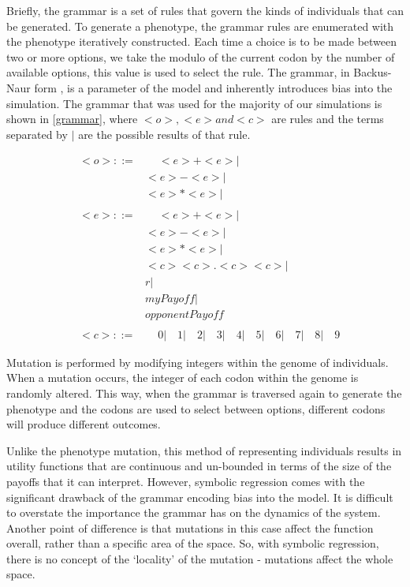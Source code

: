 \documentclass[11pt]{book}
\newcommand*{\np}{\par\noindent\newline}
\begin{document}
\np Briefly, the grammar is a set of rules that govern the kinds of individuals that can be generated.
To generate a phenotype, the grammar rules are enumerated with the phenotype iteratively constructed.
Each time a choice is to be made between two or more options, we take the modulo of the current codon by the number of available options, this value is used to select the rule.
The grammar, in Backus-Naur form \citep{oneill_grammatical_2001}, is a parameter of the model and inherently introduces bias into the simulation.
The grammar that was used for the majority of our simulations is shown in \ref{grammar}, where $<o>, <e> and <c>$ are rules and the terms separated by $|$ are the possible results of that rule.

\begin{align}\label{grammar}
	&<o> ::= \qquad <e>+<e>|\\
	& \qquad \qquad \qquad <e>-<e>| \nonumber \\
	& \qquad \qquad \qquad <e>*<e>| \nonumber \\ \nonumber \\
	&<e> ::= \qquad <e>+<e>| \nonumber \\
	&\qquad \qquad \qquad <e>-<e>| \nonumber \\
	&\qquad \qquad \qquad <e>*<e>| \nonumber \\
	&\qquad \qquad \qquad <c><c>.<c><c>| \nonumber \\
	&\qquad \qquad \qquad r| \nonumber \\
	&\qquad \qquad \qquad myPayoff| \nonumber \\
	&\qquad \qquad \qquad opponentPayoff \nonumber \\ \nonumber \\
	&<c>  ::= \qquad 0 | \quad 1 |\quad 2 |\quad 3 |\quad 4 |\quad 5 |\quad 6 |\quad 7 |\quad 8 |\quad 9 \nonumber
\end{align}


\np Mutation is performed by modifying integers within the genome of individuals.
When a mutation occurs, the integer of each codon within the genome is randomly altered.
This way, when the grammar is traversed again to generate the phenotype and the codons are used to select between options, different codons will produce different outcomes.

\np Unlike the phenotype mutation, this method of representing individuals results in utility functions that are continuous and un-bounded in terms of the size of the payoffs that it can interpret.
However, symbolic regression comes with the significant drawback of the grammar encoding bias into the model.
It is difficult to overstate the importance the grammar has on the dynamics of the system.
Another point of difference is that mutations in this case affect the function overall, rather than a specific area of the space.
So, with symbolic regression, there is no concept of the `locality' of the mutation - mutations affect the whole space.
\end{document}

